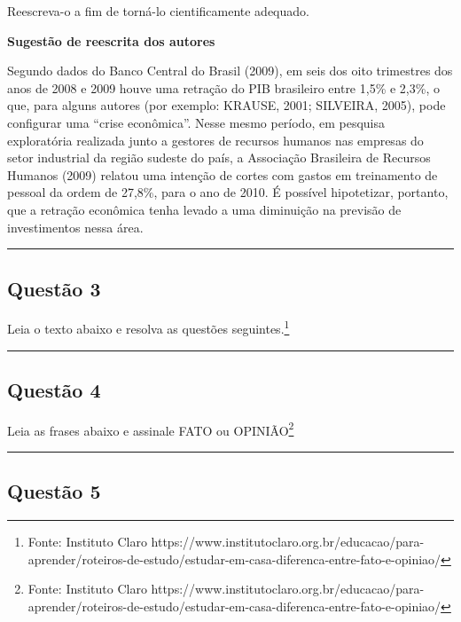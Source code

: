 \documentclass[
  letterpaper,
  DIV=11,
  numbers=noendperiod]{scrreprt}
\begin{document}
Reescreva-o a fim de torná-lo cientificamente adequado.

\textbf{Sugestão de reescrita dos autores}

Segundo dados do Banco Central do Brasil (2009), em seis dos oito
trimestres dos anos de 2008 e 2009 houve uma retração do PIB brasileiro
entre 1,5\% e 2,3\%, o que, para alguns autores (por exemplo: KRAUSE,
2001; SILVEIRA, 2005), pode configurar uma ``crise econômica''. Nesse
mesmo período, em pesquisa exploratória realizada junto a gestores de
recursos humanos nas empresas do setor industrial da região sudeste do
país, a Associação Brasileira de Recursos Humanos (2009) relatou uma
intenção de cortes com gastos em treinamento de pessoal da ordem de
27,8\%, para o ano de 2010. É possível hipotetizar, portanto, que a
retração econômica tenha levado a uma diminuição na previsão de
investimentos nessa área.

\begin{center}\rule{0.5\linewidth}{0.5pt}\end{center}

\subsection{Questão 3}\label{questuxe3o-3-1}

Leia o texto abaixo e resolva as questões seguintes.\footnote{Fonte:
  Instituto Claro
  https://www.institutoclaro.org.br/educacao/para-aprender/roteiros-de-estudo/estudar-em-casa-diferenca-entre-fato-e-opiniao/}

\begin{center}\rule{0.5\linewidth}{0.5pt}\end{center}

\subsection{Questão 4}\label{questuxe3o-4-1}

Leia as frases abaixo e assinale FATO ou OPINIÃO\footnote{Fonte:
  Instituto Claro
  https://www.institutoclaro.org.br/educacao/para-aprender/roteiros-de-estudo/estudar-em-casa-diferenca-entre-fato-e-opiniao/}

\begin{center}\rule{0.5\linewidth}{0.5pt}\end{center}

\subsection{Questão 5}\label{questuxe3o-5-1}
\end{document}
